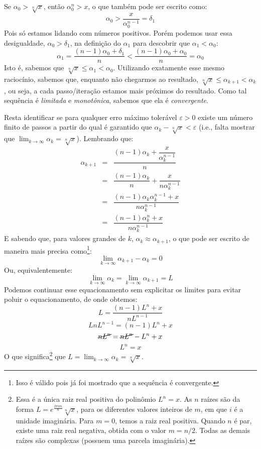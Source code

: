 \documentclass{article}
\begin{document}
Se $\alpha_0 > \sqrt[n]{x}$,
então $\alpha_0^n > x$,
o que também pode ser escrito como:
\[\alpha_0 > \dfrac{x}{\alpha_0^{n-1}} = \delta_1\]
Pois só estamos lidando com números positivos.
Porém podemos usar essa desigualdade, $\alpha_0 > \delta_1$,
na definição do $\alpha_1$
para descobrir que $\alpha_1 < \alpha_0$:
\[
  \alpha_1 = \dfrac{(n-1) \alpha_0 + \delta_1}{n}
  < \dfrac{(n-1) \alpha_0 + \alpha_0}{n} = \alpha_0
\]
Isto é, sabemos que $\sqrt[n]{x} \le \alpha_1 < \alpha_0$.
Utilizando exatamente esse mesmo raciocínio,
sabemos que, enquanto não chegarmos ao resultado,
$\sqrt[n]{x} \le \alpha_{k+1} < \alpha_k$,
ou seja, a cada passo/iteração estamos mais próximos do resultado.
Como tal sequência é \emph{limitada} e \emph{monotônica},
sabemos que ela é \emph{convergente}.

Resta identificar
se para qualquer erro máximo tolerável $\varepsilon > 0$
existe um número finito de passos a partir do qual é garantido que
$\alpha_k - \sqrt[n]{x} < \varepsilon$
(i.e., falta mostrar que $\lim_{k\to\infty} \alpha_k = \sqrt[n]{x}$).
Lembrando que:
\[
  \begin{array}{rcl}
  \alpha_{k+1}
  &=& \dfrac{(n-1) \alpha_k + \dfrac{x}{\alpha_k^{n-1}}}{n} \\[5mm]
  &=& \dfrac{(n-1) \alpha_k}{n} + \dfrac{x}{n\alpha_k^{n-1}} \\[5mm]
  &=& \dfrac{(n-1) \alpha_k \alpha_k^{n-1} + x}
            {n\alpha_k^{n-1}} \\[5mm]
  &=& \dfrac{(n-1) \alpha_k^n + x}{n\alpha_k^{n-1}}
  \end{array}
\]
E sabendo que,
para valores grandes de $k$, $\alpha_k \approx \alpha_{k+1}$,
o que pode ser escrito de maneira mais precisa como\footnote{
  Isso é válido pois já foi mostrado que a sequência é convergente.
}:
\[\lim_{k\to\infty} \alpha_{k+1} - \alpha_k = 0\]
Ou, equivalentemente:
\[\lim_{k\to\infty} \alpha_k = \lim_{k\to\infty} \alpha_{k+1} = L\]
Podemos continuar esse equacionamento
sem explicitar os limites para evitar poluir o equacionamento,
de onde obtemos:
\[L = \dfrac{(n-1) L^n + x}{n L^{n-1}}\]
\[L n L^{n-1} = (n-1) L^n + x\]
\[\cancel{nL^n} = \cancel{nL^n} - L^n + x\]
\[L^n = x\]
O que significa\footnote{
  Essa é a única raiz real positiva do polinômio $L^n = x$.
  As $n$ raízes são da forma
  $L = e^{\frac{2\pi i m}{n}} \sqrt[n]{x}$,
  para os diferentes valores inteiros de $m$,
  em que $i$ é a unidade imaginária.
  Para $m = 0$, temos a raiz real positiva.
  Quando $n$ é par, existe uma raiz real negativa,
  obtida com o valor $m = n/2$.
  Todas as demais raízes são complexas
  (possuem uma parcela imaginária).
} que $L = \lim_{k\to\infty} \alpha_k = \sqrt[n]{x}$.


\end{document}
